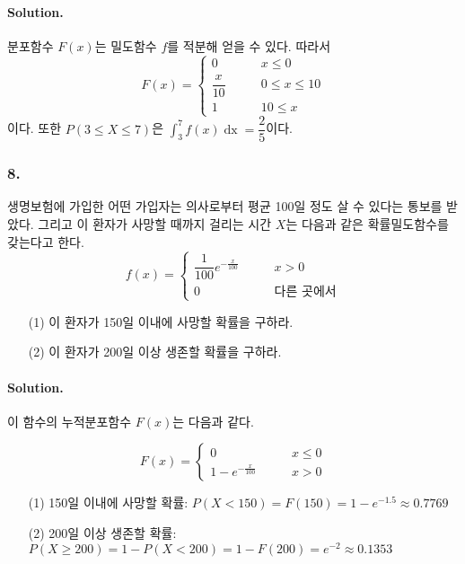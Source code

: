 \paragraph{Solution.} 분포함수 $F\left(x\right)$는 밀도함수 $f$를 적분해 얻을 수 있다. 따라서 
\[F\left(x\right) = \left\{
\begin{array}{ll}
	0 & \qquad x\leq 0 \\
	\dfrac{x}{10} & \qquad 0\leq x\leq 10 \\
	1 & \qquad 10\leq x
\end{array}
\right. \]
이다. 또한 $P\left(3\leq X\leq 7\right)$은 $\displaystyle \int_3^7 f\left(x\right) \mathop{dx} = \dfrac{2}{5}$이다.

\subsubsection{8.} 생명보험에 가입한 어떤 가입자는 의사로부터 평균 100일 정도 살 수 있다는 통보를 받았다. 그리고 이 환자가 사망할 때까지 걸리는 시간 $X$는 다음과 같은 확률밀도함수를 갖는다고 한다.
\[f\left(x\right) = \left\{
\begin{array}{ll}
	\dfrac{1}{100} e^{-\frac{x}{100}} & \qquad x>0 \\
	0 & \qquad\textrm{다른 곳에서}
\end{array}
\right. \]

\begin{itemize}
  \item [(1)] 이 환자가 150일 이내에 사망할 확률을 구하라.
  \item [(2)] 이 환자가 200일 이상 생존할 확률을 구하라.
\end{itemize}

\paragraph{Solution.} 이 함수의 누적분포함수 $F\left(x\right)$는 다음과 같다.

\[F\left(x\right) = \left\{
\begin{array}{ll}
	0 & \qquad x\leq 0 \\
	1-e^{-\frac{x}{100}} & \qquad x > 0
\end{array}
\right. \]

\begin{itemize}
  \item [(1)] 150일 이내에 사망할 확률: $P\left(X < 150\right) = F\left(150\right) = 1-e^{-1.5} \approx 0.7769$
  \item [(2)] 200일 이상 생존할 확률: $P\left(X \geq 200\right) = 1 - P\left(X < 200\right) = 1 - F\left(200\right) = e^{-2} \approx 0.1353$
\end{itemize}

